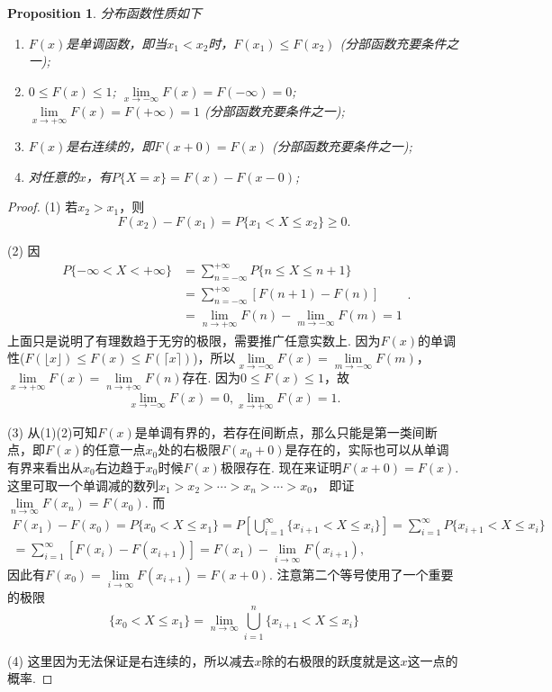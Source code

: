 \documentclass{article}
\newtheorem{proposition}[theorem]{Proposition}
\begin{document}
\begin{proposition}
\rm 分布函数性质如下
\begin{enumerate}
	\item $F(x)$是单调函数，即当$x_1 < x_2$时，$F(x_1) \leq F(x_2)$ ({\color{red}分部函数充要条件之一});
	\item $0 \leq F(x) \leq 1$; $\lim\limits_{x \rightarrow -\infty}F(x) =F(-\infty) = 0$; $\lim\limits_{x \rightarrow +\infty}F(x) =F(+\infty)= 1$ ({\color{red}分部函数充要条件之一});
	\item $F(x)$是右连续的，即$F(x+0) = F(x)$ ({\color{red}分部函数充要条件之一}); 
	\item 对任意的$x$，有$P\{X = x\} = F(x) - F(x-0)$;  
\end{enumerate}
\end{proposition}

\begin{proof}
\rm  
{\color{red}(1)} 若$x_2 > x_1$，则
$$
F(x_2)-F(x_1) = P\{x_1 < X \leq x_2\} \geq 0.
$$ 

{\color{red}(2)} 因
$$
\begin{array}{ll}
P\{-\infty < X < +\infty\} &= \sum\limits_{n=-\infty}^{+\infty}P\{n \leq X \leq n+1\} \\ 
&= \sum\limits_{n=-\infty}^{+\infty}\left[F(n+1)-F(n)\right]\\
&= \lim\limits_{n \rightarrow +\infty}F(n) - \lim\limits_{m \to -\infty} F(m)= 1 
\end{array}.
$$
上面只是说明了有理数趋于无穷的极限，需要推广任意实数上. 因为$F(x)$的单调性($ F(\lfloor x \rfloor) \leq F(x) \leq F(\lceil x \rceil)$)，所以$\lim\limits_{x \rightarrow -\infty}F(x) = \lim\limits_{m \to -\infty} F(m)$，$\lim\limits_{x \rightarrow +\infty}F(x)= \lim\limits_{n \rightarrow +\infty}F(n)$存在. 因为$0\leq F(x) \leq 1$，故
$$
\lim\limits_{x \rightarrow -\infty}F(x) =0 , \lim\limits_{x \rightarrow +\infty}F(x)=1.
$$


{\color{red}(3)} 从(1)(2)可知$F(x)$是单调有界的，若存在间断点，那么只能是第一类间断点，即$F(x)$的任意一点$x_0$处的右极限$F(x_0+0)$是存在的，实际也可以从单调有界来看出从$x_0$右边趋于$x_0$时候$F(x)$极限存在. 现在来证明$F(x+0) = F(x)$. 这里可取一个单调减的数列$x_1 > x_2 > \cdots > x_n > \cdots> x_0$， 即证$\lim\limits_{n \rightarrow \infty} F(x_n) = F(x_0)$. 而
$$
\begin{array}{ll}
F(x_1) - F(x_0) =  P\{x_0 < X \leq x_1\} =  P\left[\bigcup\limits_{i=1}^\infty\{x_{i+1} < X \leq x_{i}\}\right] = \sum\limits_{i=1}^\infty P\{x_{i+1} < X \leq x_i\} \\
= \sum\limits_{i=1}^\infty \left[F(x_i) - F(x_{i+1})\right] =  F(x_1) - \lim\limits_{i \to \infty} F(x_{i+1}),
\end{array}
$$
因此有$F(x_0) = \lim\limits_{i \to \infty} F(x_{i+1}) = F(x+0)$. 注意第二个等号使用了一个重要的极限
$$
\{x_0 < X \leq x_1\} = \lim\limits_{n \rightarrow \infty}\bigcup\limits_{i=1}^n\{x_{i+1} < X \leq x_{i}\}
$$

{\color{red}(4)} 这里因为无法保证是右连续的，所以减去$x$除的右极限的跃度就是这$x$这一点的概率.
\end{proof}
\end{document}
